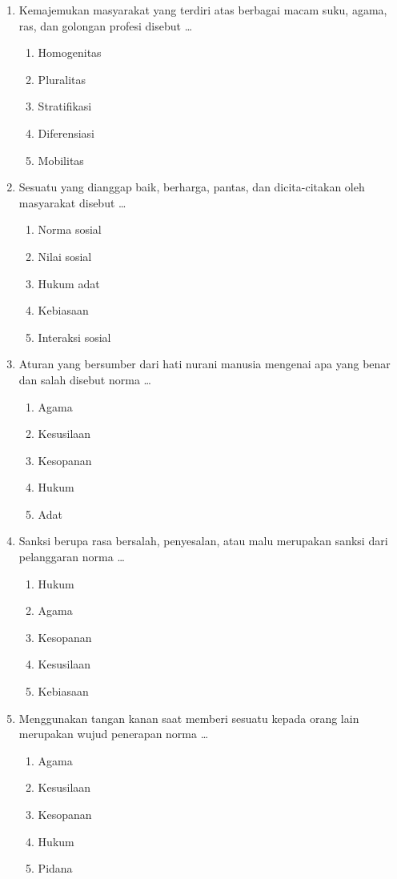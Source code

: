 \documentclass[12pt,a4paper]{article}
\begin{document}
\begin{enumerate}[leftmargin=*]
\item Kemajemukan masyarakat yang terdiri atas berbagai macam suku, agama, ras, dan golongan profesi disebut \dots
    \begin{enumerate}[label=\alph*.]
        \item Homogenitas
        \item Pluralitas
        \item Stratifikasi
        \item Diferensiasi
        \item Mobilitas
    \end{enumerate}

\item Sesuatu yang dianggap baik, berharga, pantas, dan dicita-citakan oleh masyarakat disebut \dots
    \begin{enumerate}[label=\alph*.]
        \item Norma sosial
        \item Nilai sosial
        \item Hukum adat
        \item Kebiasaan
        \item Interaksi sosial
    \end{enumerate}

\item Aturan yang bersumber dari hati nurani manusia mengenai apa yang benar dan salah disebut norma \dots
    \begin{enumerate}[label=\alph*.]
        \item Agama
        \item Kesusilaan
        \item Kesopanan
        \item Hukum
        \item Adat
    \end{enumerate}

\item Sanksi berupa rasa bersalah, penyesalan, atau malu merupakan sanksi dari pelanggaran norma \dots
    \begin{enumerate}[label=\alph*.]
        \item Hukum
        \item Agama
        \item Kesopanan
        \item Kesusilaan
        \item Kebiasaan
    \end{enumerate}

\item Menggunakan tangan kanan saat memberi sesuatu kepada orang lain merupakan wujud penerapan norma \dots
    \begin{enumerate}[label=\alph*.]
        \item Agama
        \item Kesusilaan
        \item Kesopanan
        \item Hukum
        \item Pidana
    \end{enumerate}


\end{enumerate}
\end{document}
